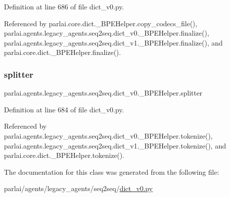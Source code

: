 Definition at line 686 of file dict\+\_\+v0.\+py.



Referenced by parlai.\+core.\+dict.\+\_\+\+B\+P\+E\+Helper.\+copy\+\_\+codecs\+\_\+file(), parlai.\+agents.\+legacy\+\_\+agents.\+seq2seq.\+dict\+\_\+v0.\+\_\+\+B\+P\+E\+Helper.\+finalize(), parlai.\+agents.\+legacy\+\_\+agents.\+seq2seq.\+dict\+\_\+v1.\+\_\+\+B\+P\+E\+Helper.\+finalize(), and parlai.\+core.\+dict.\+\_\+\+B\+P\+E\+Helper.\+finalize().

\mbox{\label{classparlai_1_1agents_1_1legacy__agents_1_1seq2seq_1_1dict__v0_1_1__BPEHelper_aa887d94516544a4b161e9d36eb9070f5}} 
\subsubsection{\texorpdfstring{splitter}{splitter}}
{\footnotesize\ttfamily parlai.\+agents.\+legacy\+\_\+agents.\+seq2seq.\+dict\+\_\+v0.\+\_\+\+B\+P\+E\+Helper.\+splitter}



Definition at line 684 of file dict\+\_\+v0.\+py.



Referenced by parlai.\+agents.\+legacy\+\_\+agents.\+seq2seq.\+dict\+\_\+v0.\+\_\+\+B\+P\+E\+Helper.\+tokenize(), parlai.\+agents.\+legacy\+\_\+agents.\+seq2seq.\+dict\+\_\+v1.\+\_\+\+B\+P\+E\+Helper.\+tokenize(), and parlai.\+core.\+dict.\+\_\+\+B\+P\+E\+Helper.\+tokenize().



The documentation for this class was generated from the following file\+:\begin{DoxyCompactItemize}
\item 
parlai/agents/legacy\+\_\+agents/seq2seq/\hyperlink{dict__v0_8py}{dict\+\_\+v0.\+py}\end{DoxyCompactItemize}

